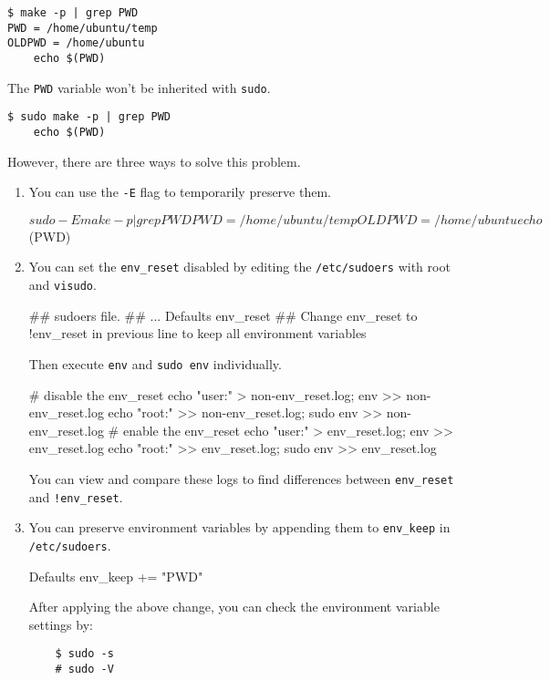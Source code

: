 \documentclass[10pt, oneside]{book}
\begin{document}
\begin{verbatim}
$ make -p | grep PWD
PWD = /home/ubuntu/temp
OLDPWD = /home/ubuntu
	echo $(PWD)
\end{verbatim}

The \verb|PWD| variable won't be inherited with \verb|sudo|.

\begin{verbatim}
$ sudo make -p | grep PWD
	echo $(PWD)
\end{verbatim}

However, there are three ways to solve this problem.

\begin{enumerate}
  \item {
  You can use the \verb|-E| flag to temporarily preserve them.
  
  \begin{codebash}
    $ sudo -E make -p | grep PWD
    PWD = /home/ubuntu/temp
    OLDPWD = /home/ubuntu
    echo $(PWD)
  \end{codebash}
  }

  \item {
  You can set the \verb|env_reset| disabled by editing the \verb|/etc/sudoers| with root and \verb|visudo|. 

  \begin{code}
  ## sudoers file.
  ## 
  ...
  Defaults env_reset
  ## Change env_reset to !env_reset in previous line to keep all environment variables
  \end{code}

  Then execute \verb|env| and \verb|sudo env| individually.

  \begin{codebash}
    # disable the env_reset
    echo "user:" > non-env_reset.log; env >> non-env_reset.log
    echo "root:" >> non-env_reset.log; sudo env >> non-env_reset.log
    # enable the env_reset
    echo "user:" > env_reset.log; env >> env_reset.log
    echo "root:" >> env_reset.log; sudo env >> env_reset.log
  \end{codebash}

  You can view and compare these logs to find differences between \verb|env_reset| and \verb|!env_reset|. 
  }

  \item {You can preserve environment variables by appending them to \verb|env_keep| in \verb|/etc/sudoers|. 
  
  \begin{code}
  Defaults env_keep += "PWD"
  \end{code}

  After applying the above change, you can check the environment variable settings by:

  \begin{verbatim}
    $ sudo -s
    # sudo -V
  \end{verbatim}
  }
\end{enumerate}
\end{document}
